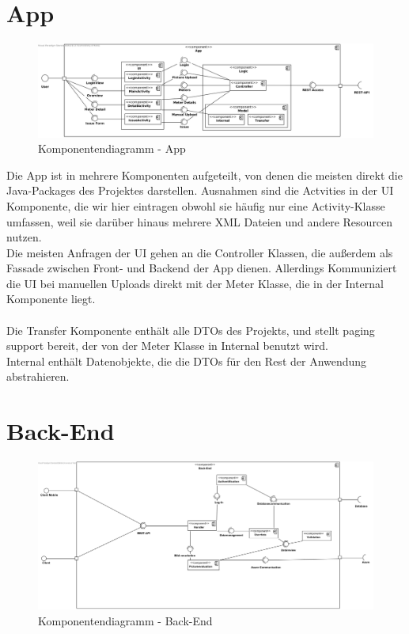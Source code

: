 \section{App}

\begin{figure}[h]
\includegraphics[scale=0.45]{img/diagrams/AppComponentDiagram}\caption{Komponentendiagramm - App}  
\end{figure}

Die App ist in mehrere Komponenten aufgeteilt, von denen die meisten direkt die Java-Packages des Projektes darstellen. Ausnahmen sind die Actvities in der UI Komponente, die wir hier eintragen obwohl sie häufig nur eine Activity-Klasse umfassen, weil sie darüber hinaus mehrere XML Dateien und andere Resourcen nutzen.\\
Die meisten Anfragen der UI gehen an die Controller Klassen, die außerdem als Fassade zwischen Front- und Backend der App dienen. Allerdings Kommuniziert die UI bei manuellen Uploads direkt mit der Meter Klasse, die in der Internal Komponente liegt.\\ \\
Die Transfer Komponente enthält alle DTOs des Projekts, und stellt paging support bereit, der von der Meter Klasse in Internal benutzt wird.\\
Internal enthält Datenobjekte, die die DTOs für den Rest der Anwendung abstrahieren.

\section{Back-End}

\begin{figure}[h]
\includegraphics[width=15cm]{img/diagrams/component-back-end}
\caption{Komponentendiagramm - Back-End} 
\end{figure}

